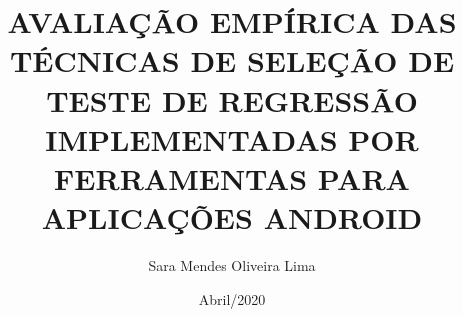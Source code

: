 \documentclass[pt, qual, classic, oneside, a4paper, scr]{ufba/ufbathesis}
\institute{Instituto de Matem\'{a}tica e Estatística}
\title{AVALIAÇÃO EMPÍRICA DAS TÉCNICAS DE SELEÇÃO DE TESTE DE REGRESSÃO IMPLEMENTADAS POR FERRAMENTAS PARA APLICAÇÕES ANDROID}
\date{Abril/2020}
\author{Sara Mendes Oliveira Lima}
\begin{document}
\pgcompfrontpage
\frontmatter

\pgcomppresentationpage



\tableofcontents
\listoffigures
\listoftables



\mainmatter








\backmatter





\end{document}
